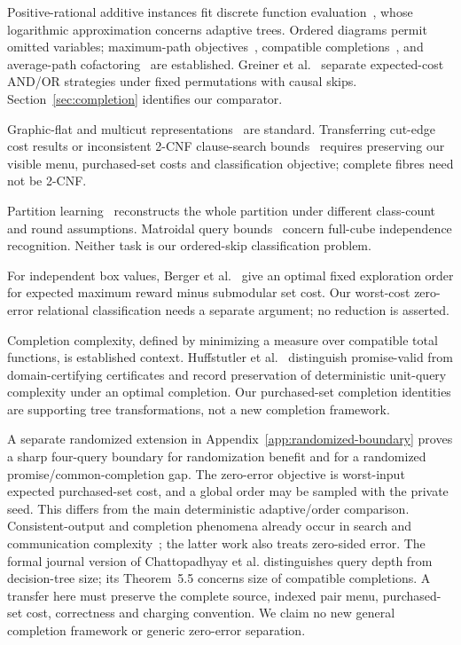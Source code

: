 \documentclass[pdflatex,sn-mathphys-num]{sn-jnl}
\theoremstyle{thmstyleone}
\theoremstyle{thmstylethree}
\theoremstyle{thmstyletwo}
\begin{document}
Positive-rational additive instances fit discrete function evaluation~\cite{cicalese14}, whose logarithmic approximation concerns adaptive trees. Ordered diagrams permit omitted variables; maximum-path objectives~\cite{ebendt06,ebendt05}, compatible completions~\cite{oliveira,sasao}, and average-path cofactoring~\cite{jiang} are established. Greiner et al.~\cite{greiner} separate expected-cost AND/OR strategies under fixed permutations with causal skips. Section~\ref{sec:completion} identifies our comparator.

Graphic-flat and multicut representations~\cite{berczi,hornakova} are standard. Transferring cut-edge cost results or inconsistent 2-CNF clause-search bounds~\cite{lovasz} requires preserving our visible menu, purchased-set costs and classification objective; complete fibres need not be 2-CNF.

Partition learning~\cite{liu,black} reconstructs the whole partition under different class-count and round assumptions. Matroidal query bounds~\cite{kulkarni} concern full-cube independence recognition. Neither task is our ordered-skip classification problem.

For independent box values, Berger et al.~\cite{pandora} give an optimal fixed exploration order for expected maximum reward minus submodular set cost. Our worst-cost zero-error relational classification needs a separate argument; no reduction is asserted.

Completion complexity, defined by minimizing a measure over compatible total functions, is established context. Huffstutler et al.~\cite{huffstutler2026completion} distinguish promise-valid from domain-certifying certificates and record preservation of deterministic unit-query complexity under an optimal completion. Our purchased-set completion identities are supporting tree transformations, not a new completion framework.

A separate randomized extension in Appendix~\ref{app:randomized-boundary} proves a sharp four-query boundary for randomization benefit and for a randomized promise/common-completion gap. The zero-error objective is worst-input expected purchased-set cost, and a global order may be sampled with the private seed. This differs from the main deterministic adaptive/order comparison. Consistent-output and completion phenomena already occur in search and communication complexity~\cite{chattopadhyay2025pseudo,goos2026pseudo,watson2026pseudo}; the latter work also treats zero-sided error. The formal journal version of Chattopadhyay et al. distinguishes query depth from decision-tree size; its Theorem~5.5 concerns size of compatible completions. A transfer here must preserve the complete source, indexed pair menu, purchased-set cost, correctness and charging convention. We claim no new general completion framework or generic zero-error separation.
\end{document}
